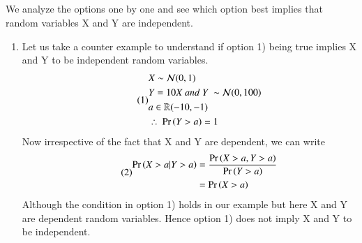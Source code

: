 \documentclass[journal,12pt,twocolumn]{IEEEtran}
\begin{document}
\subsection*{}
We analyze the options one by one and see which option best implies that random variables X and Y are independent. \\
\begin{enumerate}
    \item Let us take a counter example to understand if option 1) being true implies X and Y to be independent random variables.
\begin{align}\tag{1}
    \begin{split}
        &X \sim \mathcal{N}(0, 1)\\
        &Y = 10X\ and\ Y\ \sim \mathcal{N}(0, 100)\\
        &a \in \mathbb{R}(-10, -1)\\
        &\therefore\ \Pr\left(Y>a\right) = 1\\
    \end{split}
\end{align}
Now irrespective of the fact that X and Y are dependent, we can write
\begin{align}\tag{2}
    \begin{split}
        \Pr\left(X>a|Y>a\right) &= \frac{\Pr\left(X>a, Y>a\right)}{\Pr\left(Y>a\right)}\\
                     &= \Pr\left(X>a\right)
    \end{split}
\end{align}
Although the condition in option 1) holds in our example but here X and Y are dependent random variables. Hence option 1) does not imply X and Y to be independent.\\


\end{enumerate}
\end{document}
